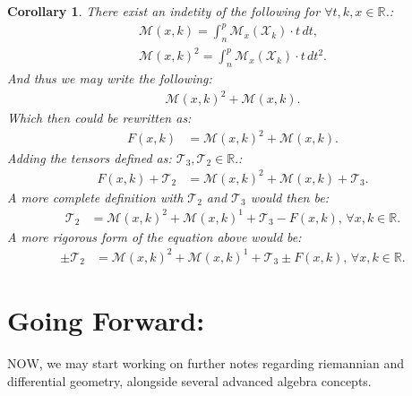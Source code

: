 \documentclass[10pt]{article}
\theoremstyle{plain}
\newtheorem{corollary}[theorem]{Corollary}
\theoremstyle{definition}
\theoremstyle{remark}
\begin{document}
\begin{corollary}
	There exist an indetity of the following for $\forall t, k, x \in \mathbb{R}$.:
	\begin{align*}
		\mathcal{M}(x, k) = \int_{n}^{p} \mathcal{M}_{x}(\mathcal{X}_k) \cdot t \, dt,\\
		\mathcal{M}(x, k)^{2} = \int_{n}^{p} \mathcal{M}_{x}(\mathcal{X}_k) \cdot t \, dt^{2}.
	\end{align*}
	And thus we may write the following:
	\begin{align*}
		\mathcal{M}(x, k)^{2} + \mathcal{M}(x, k).
	\end{align*}
	Which then could be rewritten as:
	\begin{align*}
		F(x, k) &= \mathcal{M}(x, k)^{2} + \mathcal{M}(x, k).
	\end{align*}
	Adding the tensors defined as: $\mathcal{T}_3, \mathcal{T}_2 \in \mathbb{R}.$:
	\begin{align*}
		F(x, k) + \mathcal{T}_2 &= \mathcal{M}(x, k)^{2} + \mathcal{M}(x, k) + \mathcal{T}_3.
	\end{align*}
	A more complete definition with $\mathcal{T}_2$ and $\mathcal{T}_3$ would then be:
	\begin{align*}
		\mathcal{T}_2 &= \mathcal{M}(x, k)^{2} + \mathcal{M}(x, k)^{1} + \mathcal{T}_3 - F(x, k), \, \forall x, k \in \mathbb{R}.
	\end{align*}
	A more rigorous form of the equation above would be:
	\begin{align*}
			\pm \mathcal{T}_2 &= \mathcal{M}(x, k)^{2} + \mathcal{M}(x, k)^{1} + \mathcal{T}_3 \pm F(x, k), \, \forall x, k \in \mathbb{R}.
	\end{align*}
\end{corollary}

\section{Going Forward:}

\lettrine[lines=1, lhang=0.1, loversize=0.2]{N}OW, we may start working on further notes regarding riemannian and differential geometry, alongside several advanced algebra concepts.

\nocite{*}




\end{document}
